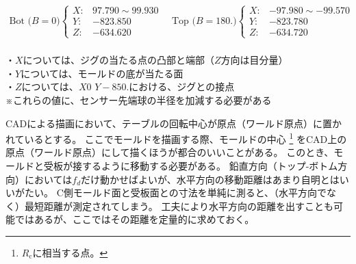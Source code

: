 
\begin{tcolorbox}[title={2023/07/28時点の\MMname 実測値}, fonttitle=\gtfamily\bfseries]
\begin{align*}
  \text{Bot ($B=0$)}
  \left\{
  \begin{array}{rl}
    X: & 97.790 \sim 99.930\\
    Y: & -823.850\\
    Z: & -634.620
  \end{array}
  \right.\quad
  \text{Top ($B=180.$)}
  \left\{
  \begin{array}{rl}
    X: & -97.980 \sim -99.570\\
    Y: & -823.780\\
    Z: & -634.720
  \end{array}
  \right.
\end{align*}\\
・$X$については、ジグの当たる点の凸部と端部（$Z$方向は目分量）\\
・$Y$については、モールドの底が当たる面\\
・$Z$については、$X0$ $Y-850.$における、ジグとの接点\\
※これらの値に、センサー先端球の半径を加減する必要がある
\end{tcolorbox}




CADによる描画において、テーブルの回転中心が原点（ワールド原点）に置かれているとする。
ここでモールドを描画する際、モールドの中心
\footnote{$R_\mathrm c$に相当する点。}\relax
をCAD上の原点（ワールド原点）にして描くほうが都合のいいことがある。
このとき、モールドと受板が接するように移動する必要がある。
鉛直方向（トップ-ボトム方向）においては$f_d$だけ動かせばよいが、水平方向の移動距離はあまり自明とはいいがたい。
C側モールド面と受板面との寸法を単純に測ると、（水平方向でなく）最短距離が測定されてしまう。
工夫により水平方向の距離を出すことも可能ではあるが、ここではその距離を定量的に求めておく。



